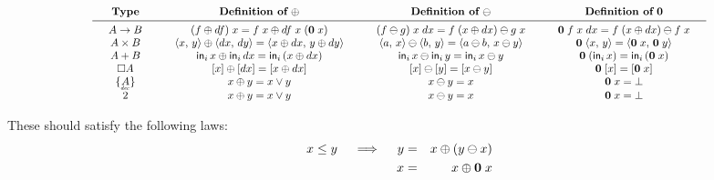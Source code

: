\documentclass{article}
\begin{document}
\begin{center}
\[
\scalebox{0.85}{\(
\arraycolsep=1.5em
\begin{array}{cccc}
  \textbf{Type}
  & {\textbf{Definition of}~\oplus}
  & {\textbf{Definition of}~\ominus}
  & {\textbf{Definition of}~\zero}
  \\ \midrule
  A \to B
  & (f \oplus df)\; x = f\; x \oplus df\; x\; (\zero\; x)
  & (f \ominus g)\; x \;dx = f\; (x \oplus dx) \ominus g \; x
  & \zero\; f\; x\; dx = f\; (x \oplus dx) \ominus f\; x
  \\
  A \x B
  & \pair{x}{y} \oplus \pair{dx}{dy} = \pair{x \oplus dx}{y \oplus dy}
  & \pair{a}{x} \ominus \pair{b}{y} = \pair{a \ominus b}{x \ominus y}
  & \zero \; \pair{x}{y} = \pair{\zero\; x}{\zero\; y}
  \\
  A + B
  & \inj{i}{x} \oplus \inj{i}{dx} = \inj{i}{(x \oplus dx)}
  & \inj{i}{x} \ominus \inj{i}{y} = \inj{i}{x \ominus y}
  & \zero\; (\inj{i}{x}) = \inj{i}{(\zero\;x)}
  \\
  \Disc{A}
  & \disc{x} \oplus \disc{dx} = \disc{x \oplus dx}
  & \disc{x} \ominus \disc{y} = \disc{x \ominus y}
  & \zero\; \disc{x} = \disc{\zero\; x}
  \\
  \Seteq{A}
  & x \oplus y = x \vee y
  & x \ominus y = x
  & \zero\; x = \unit
  \\
  \tbool
  & x \oplus y = x \vee y
  & x \ominus y = x
  & \zero\; x = \unit
\end{array}
\)}
\]
\end{center}

These should satisfy the following laws:
\begin{eqnarray}
  x \le y \quad\implies\quad
  y &=& x \oplus (y \ominus x)\\
  x &=& x \oplus \mathbf{0}\; x
\end{eqnarray}




\end{document}
